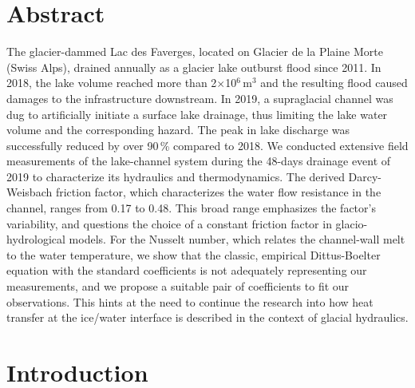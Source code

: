 
\section{Abstract}

The glacier-dammed Lac des Faverges, located on Glacier de la Plaine Morte (Swiss Alps), drained annually as a glacier lake outburst flood since 2011. In 2018, the lake volume reached more than 2$\times$10$^6$\,m$^3$ and the resulting flood caused damages to the infrastructure downstream. In 2019, a supraglacial channel was dug to artificially initiate a surface lake drainage, thus limiting the lake water volume and the corresponding hazard. The peak in lake discharge was successfully reduced by over 90\,\% compared to 2018. We conducted extensive field measurements of the lake-channel system during the 48-days drainage event of 2019 to characterize its hydraulics and thermodynamics. The derived Darcy-Weisbach friction factor, which characterizes the water flow resistance in the channel, ranges from 0.17 to 0.48. This broad range emphasizes the factor’s variability, and questions the choice of a constant friction factor in glacio-hydrological models. For the Nusselt number, which relates the channel-wall melt to the water temperature, we show that the classic, empirical Dittus-Boelter equation with the standard coefficients is not adequately representing our measurements, and we propose a suitable pair of coefficients to fit our observations. This hints at the need to continue the research into how heat transfer at the ice/water interface is described in the context of glacial hydraulics.

\section{Introduction}

